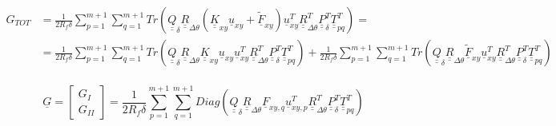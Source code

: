 \documentclass[a4paper]{jpconf}
\begin{document}
\begin{equation}
\begin{split}
G_{TOT} &= \frac{1}{2R_{f}\delta}\sum_{p=1}^{m+1}\sum_{q=1}^{m+1}Tr\left(\underline{\underline{Q}}_{\delta}\underline{\underline{R}}_{\Delta\theta}\left(\underline{\underline{K}}_{xy}\underline{u}_{xy}+\underline{\widetilde{F}}_{xy}\right)\underline{u}_{xy}^{T}\underline{\underline{R}}_{\Delta\theta}^{T}\underline{\underline{P}}_{\delta}^{T}\underline{\underline{T}}_{pq}^{T}\right)=\\
&=\frac{1}{2R_{f}\delta}\sum_{p=1}^{m+1}\sum_{q=1}^{m+1}Tr\left(\underline{\underline{Q}}_{\delta}\underline{\underline{R}}_{\Delta\theta}\underline{\underline{K}}_{xy}\underline{u}_{xy}\underline{u}_{xy}^{T}\underline{\underline{R}}_{\Delta\theta}^{T}\underline{\underline{P}}_{\delta}^{T}\underline{\underline{T}}_{pq}^{T}\right)+\frac{1}{2R_{f}\delta}\sum_{p=1}^{m+1}\sum_{q=1}^{m+1}Tr\left(\underline{\underline{Q}}_{\delta}\underline{\underline{R}}_{\Delta\theta}\underline{\widetilde{F}}_{xy}\underline{u}_{xy}^{T}\underline{\underline{R}}_{\Delta\theta}^{T}\underline{\underline{P}}_{\delta}^{T}\underline{\underline{T}}_{pq}^{T}\right)\\
\end{split}
\end{equation}

\begin{equation}
\underline{G}=\begin{bmatrix}
G_{I} \\
G_{II}
\end{bmatrix}=\frac{1}{2R_{f}\delta}\sum_{p=1}^{m+1}\sum_{q=1}^{m+1}Diag\left(\underline{\underline{Q}}_{\delta}\underline{\underline{R}}_{\Delta\theta}\underline{F}_{xy,q}\underline{u}_{xy,p}^{T}\underline{\underline{R}}_{\Delta\theta}^{T}\underline{\underline{P}}_{\delta}^{T}\underline{\underline{T}}_{pq}^{T}\right)
\end{equation}
\end{document}

